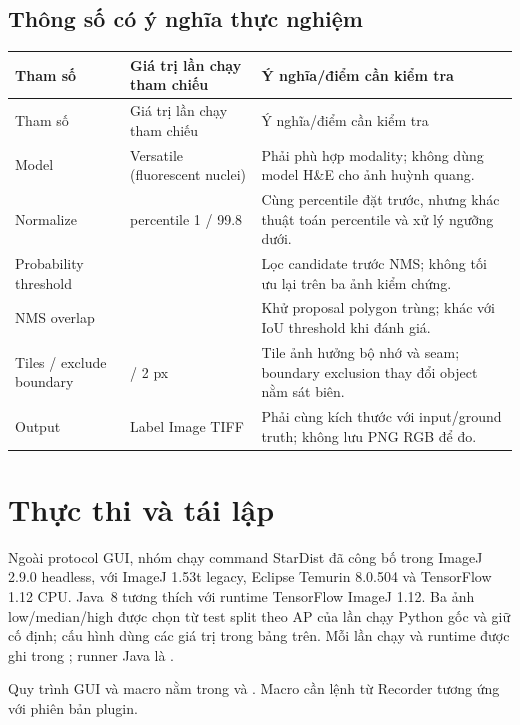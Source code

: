 \documentclass[12pt,a4paper]{report}
\begin{document}
\subsection{Thông số có ý nghĩa thực nghiệm}
\begin{longtable}{>{\raggedright\arraybackslash}p{3.2cm}>{\raggedright\arraybackslash}p{4.0cm}>{\raggedright\arraybackslash}p{6.2cm}}
\toprule
Tham số & Giá trị lần chạy tham chiếu & Ý nghĩa/điểm cần kiểm tra\\
\midrule\endfirsthead
\toprule Tham số & Giá trị lần chạy tham chiếu & Ý nghĩa/điểm cần kiểm tra\\\midrule\endhead
Model & Versatile (fluorescent nuclei) & Phải phù hợp modality; không dùng model H\&E cho ảnh huỳnh quang.\\
Normalize & percentile 1 / 99.8 & Cùng percentile đặt trước, nhưng khác thuật toán percentile và xử lý ngưỡng dưới.\\
Probability threshold & 0.479071 & Lọc candidate trước NMS; không tối ưu lại trên ba ảnh kiểm chứng.\\
NMS overlap & 0.3 & Khử proposal polygon trùng; khác với IoU threshold khi đánh giá.\\
Tiles / exclude boundary & 1 / 2 px & Tile ảnh hưởng bộ nhớ và seam; boundary exclusion thay đổi object nằm sát biên.\\
Output & Label Image TIFF & Phải cùng kích thước với input/ground truth; không lưu PNG RGB để đo.\\
\bottomrule
\end{longtable}

\section{Thực thi và tái lập}
Ngoài protocol GUI, nhóm chạy command StarDist đã công bố
 trong ImageJ 2.9.0 headless,
với ImageJ 1.53t legacy, Eclipse Temurin 8.0.504 và TensorFlow 1.12 CPU. Java~8 tương thích với runtime TensorFlow ImageJ 1.12. Ba ảnh low/median/high được chọn từ test split theo AP của lần chạy Python
gốc và giữ cố định; cấu hình dùng các giá trị trong bảng trên. Mỗi lần chạy và runtime được ghi trong
; runner Java là
.

Quy trình GUI và macro nằm trong 
và . Macro cần lệnh từ Recorder tương ứng
với phiên bản plugin.
\end{document}
